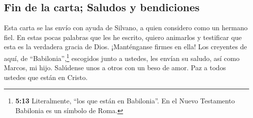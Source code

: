 \hypertarget{fin-de-la-carta-saludos-y-bendiciones}{%
\subsection{Fin de la carta; Saludos y
bendiciones}\label{fin-de-la-carta-saludos-y-bendiciones}}

 Esta carta se las envío con ayuda de Silvano, a quien
considero como un hermano fiel. En estas pocas palabras que les he
escrito, quiero animarlos y testificar que esta es la verdadera gracia
de Dios. ¡Manténganse firmes en ella!  Los creyentes de
aquí, de ``Babilonia'',\footnote{\textbf{5:13} Literalmente, ``los que
  están en Babilonia''. En el Nuevo Testamento Babilonia es un símbolo
  de Roma.} escogidos junto a ustedes, les envían su saludo, así como
Marcos, mi hijo.  Salúdense unos a otros con un beso de
amor. Paz a todos ustedes que están en Cristo.
